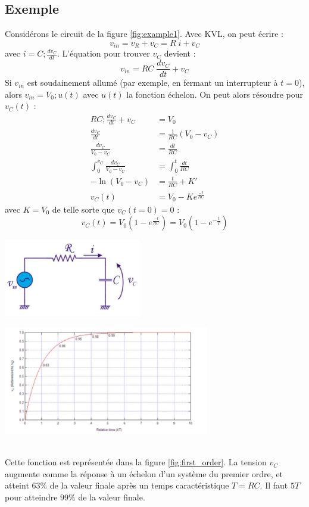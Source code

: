 \subsection{Exemple}

Considérons le circuit de la figure \ref{fig:example1}. Avec KVL, on peut écrire :
$$
v_{in} = v_R + v_C = R \; i + v_C
$$
avec $i = C ; \frac{dv_C}{dt}$. L'équation pour trouver $v_C$ devient :
$$
v_{in} = RC \; \frac{dv_C}{dt} + v_C
$$
Si $v_{in}$ est soudainement allumé (par exemple, en fermant un interrupteur à $t=0$), alors $v_{in} = V_0 ; u(t)$ avec $u(t)$ la fonction échelon. On peut alors résoudre pour $v_C(t)$ :
\begin{align*}
	RC ; \frac{dv_C}{dt} + v_C &= V_0 \\
	\frac{dv_C}{dt} &= \frac{1}{RC} (V_0 - v_C) \\
	\frac{dv_C}{V_0 - v_C} &= \frac{dt}{RC} \\
	\int_0^{v_C} \frac{dv_C}{V_0 - v_C} &= \int_0^t \frac{dt}{RC} \\
	- \ln(V_0 - v_C) &= \frac{t}{RC} + K' \\
	v_C(t) &= V_0 - K e^{\frac{-t}{RC}}
\end{align*}
avec $K = V_0$ de telle sorte que $v_C(t=0) = 0$ :
$$
v_C(t) = V_0(1 - e^{\frac{-t}{RC}}) = V_0(1 - e^{-\frac{t}{T}})
$$

\begin{minipage}{.5\textwidth}
	\centering
	\includegraphics[width=6cm]{figures/ch00/example1.jpg}
	\label{fig:example1}
\end{minipage}
\begin{minipage}{.5\textwidth}
	\centering
	\includegraphics[width=9cm]{figures/ch00/first_order.jpg}
	\label{fig:first_order}
\end{minipage}%
\\Cette fonction est représentée dans la figure \ref{fig:first_order}. La tension $v_C$ augmente comme la réponse à un échelon d'un système du premier ordre, et atteint $63\%$ de la valeur finale après un temps caractéristique $T = RC$. Il faut $5T$ pour atteindre $99\%$ de la valeur finale.
